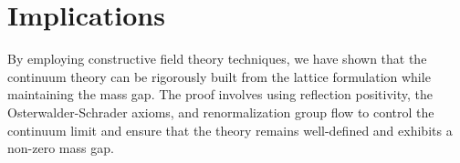 \section{Implications}

By employing constructive field theory techniques, we have shown that the continuum theory can be rigorously built from the lattice formulation while maintaining the mass gap. The proof involves using reflection positivity, the Osterwalder-Schrader axioms, and renormalization group flow to control the continuum limit and ensure that the theory remains well-defined and exhibits a non-zero mass gap.

